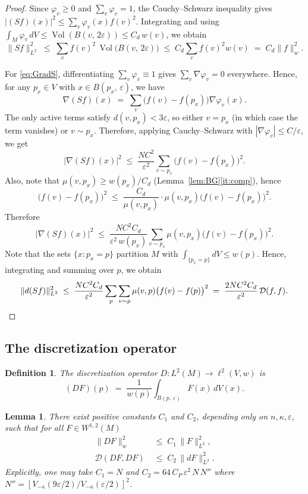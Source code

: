 \documentclass[10pt,reqno]{amsart}
\newtheorem{lemma}[theorem]{Lemma}
\newtheorem{definition}[theorem]{Definition}
\theoremstyle{remark}
\newcommand{\Vol}{\operatorname{Vol}}
\newcommand{\normw}[1]{\lVert #1 \rVert_{w}}
\newcommand{\norml}[1]{\lVert #1 \rVert_{L^{2}}}
\newcommand{\DD}{\mathcal{D}}
\newcommand{\Vk}{V_{-\kappa}}
\newcommand{\B}[2]{B(#1,\,#2)}
\begin{document}
\begin{proof}
Since $\varphi_v\geq 0$ and $\sum_v\varphi_v=1$, the Cauchy--Schwarz
inequality gives $|(Sf)(x)|^2\leq\sum_v\varphi_v(x)f(v)^2$.
Integrating and using
$\int_M\varphi_v\,dV\leq\Vol(\B{v}{2\varepsilon})\leq C_d\,w(v)$, we obtain
\[
  \norml{Sf}^2
  \;\leq\;
  \sum_v f(v)^2\,\Vol\!\bigl(\B{v}{2\varepsilon}\bigr)
  \;\leq\;
  C_d\sum_v f(v)^2 w(v)
  \;=\;
  C_d\normw{f}^2.
\]

For \eqref{eq:GradS}, differentiating $\sum_v\varphi_v\equiv 1$ gives
$\sum_v\nabla\varphi_v=0$ everywhere.
Hence, for any $p_x\in V$ with $x\in\B{p_x}{\varepsilon}$, we have
\[
  \nabla(Sf)(x)
  \;=\;
  \sum_v\bigl(f(v)-f(p_x)\bigr)\nabla\varphi_v(x).
\]
The only active terms satisfy $d(v,p_x)<3\varepsilon$, so either
$v=p_x$ (in which case the term vanishes) or $v\sim p_x$.
Therefore, applying Cauchy--Schwarz with $|\nabla\varphi_v|\leq C/\varepsilon$, we get
\[
  |\nabla(Sf)(x)|^2
  \;\leq\;
  \frac{NC^2}{\varepsilon^2}
  \sum_{v\sim p_x}\!\bigl(f(v)-f(p_x)\bigr)^2.
\]
Also, note that $\mu(v,p_x)\geq w(p_x)/C_d$ (Lemma~\ref{lem:BG}\ref{it:comp}), hence
\[
  \bigl(f(v)-f(p_x)\bigr)^2
  \;\leq\;
  \frac{C_d}{\mu(v,p_x)}\cdot\mu(v,p_x)\bigl(f(v)-f(p_x)\bigr)^2.
\]
Therefore
\[
  |\nabla(Sf)(x)|^2
  \;\leq\;
  \frac{NC^2 C_d}{\varepsilon^2\,w(p_x)}
  \sum_{v\sim p_x}\mu(v,p_x)\bigl(f(v)-f(p_x)\bigr)^2.
\]
Note that the sets $\{x:p_x=p\}$ partition $M$ with $\int_{\{p_x=p\}}dV\leq w(p)$. Hence,
integrating and summing over $p$, we obtain
\[
  \norml{d(Sf)}^2
  \;\leq\;
  \frac{NC^2 C_d}{\varepsilon^2}
  \sum_p\sum_{v\sim p}\mu(v,p)\bigl(f(v)-f(p)\bigr)^2
  \;=\;
  \frac{2NC^2 C_d}{\varepsilon^2}\,\DD(f,f).
  \qedhere
\]
\end{proof}

\subsection{The discretization operator}

\begin{definition}
\label{def:disc-op}
The \emph{discretization operator} $D:L^2(M)\to\ell^2(V,w)$ is
\[
  (DF)(p)
  \;=\;
  \frac{1}{w(p)}\int_{\B{p}{\varepsilon}}F(x)\,dV(x).
\]
\end{definition}

\begin{lemma}
\label{lem:disc}
There exist positive constants $C_1$ and $C_2$, depending only on
$n,\kappa,\varepsilon$, such that for all $F\in W^{1,2}(M)$
\begin{align}
  \normw{DF}^2 &\;\leq\; C_1\,\norml{F}^2,
  \label{eq:L2D}\\
  \DD(DF,DF) &\;\leq\; C_2\,\norml{dF}^2.
  \label{eq:GradD}
\end{align}
Explicitly, one may take $C_1=N$ and $C_2=64\,C_P\,\varepsilon^2\,N\,N''$
where $N''=[\Vk(9\varepsilon/2)/\Vk(\varepsilon/2)]^2$.
\end{lemma}
\end{document}
